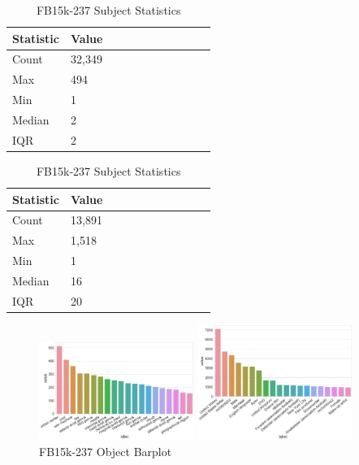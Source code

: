 \begin{table}[H]
	\parbox{.5\linewidth}{
		\caption{WN18RR Subject Statistics}
		\centering
		\begin{tabular}{lllllllllll}
  			\textbf{Statistic} & \textbf{Value}  \\
  			\hline
			Count & 32,349 \\
			Max & 494 \\
			Min & 1 \\
  			Median & 2 \\
  			IQR & 2 \\
		\end{tabular}
		}
	\hfill
	\parbox{.5\linewidth}{
		\caption{FB15k-237 Subject Statistics}
		\centering
		\begin{tabular}{lllllllllll}
  			\textbf{Statistic} & \textbf{Value}  \\
  			\hline
			Count &13,891 \\
			Max & 1,518 \\
			Min & 1 \\
  			Median & 16 \\
  			IQR & 20 \\
		\end{tabular}
		}
\end{table}


\begin{figure}[H]
	\parbox{.5\linewidth}{
   		\caption{WN18RR Object Barplot}
   		\centering
    		\includegraphics[width=0.45\textwidth, height=0.2\textheight]{WN18RR_Object_Counts}
		}
	\hfill
	\parbox{.5\linewidth}{
		\caption{FB15k-237 Object Barplot}
   		\centering
		\includegraphics[width=0.45\textwidth, height=0.2\textheight]{FB15k-237_Object_Counts}
		}
\end{figure}



